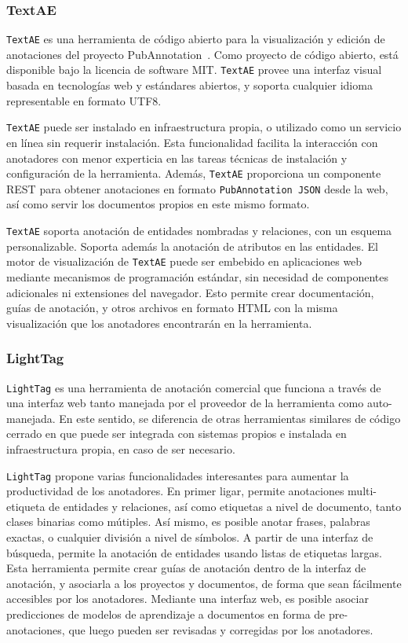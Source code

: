 \subsubsection*{TextAE}

\texttt{TextAE} es una herramienta de código abierto para la visualización y edición de anotaciones del proyecto PubAnnotation~\cite{kim2012pubannotation}.
Como proyecto de código abierto, está disponible bajo la licencia de software MIT.
\texttt{TextAE} provee una interfaz visual basada en tecnologías web y estándares abiertos, y soporta cualquier idioma representable en formato UTF8.

\texttt{TextAE} puede ser instalado en infraestructura propia, o utilizado como un servicio en línea sin requerir instalación.
Esta funcionalidad facilita la interacción con anotadores con menor experticia en las tareas técnicas de instalación y configuración de la herramienta.
Además, \texttt{TextAE} proporciona un componente REST para obtener anotaciones en formato \texttt{PubAnnotation JSON} desde la web, así como servir los documentos propios en este mismo formato.

\texttt{TextAE} soporta anotación de entidades nombradas y relaciones, con un esquema personalizable.
Soporta además la anotación de atributos en las entidades.
El motor de visualización de \texttt{TextAE} puede ser embebido en aplicaciones web mediante mecanismos de programación estándar, sin necesidad de componentes adicionales ni extensiones del navegador.
Esto permite crear documentación, guías de anotación, y otros archivos en formato HTML con la misma visualización que los anotadores encontrarán en la herramienta.

\subsubsection*{LightTag}

\texttt{LightTag} es una herramienta de anotación comercial que funciona a través de una interfaz web tanto manejada por el proveedor de la herramienta como auto-manejada.
En este sentido, se diferencia de otras herramientas similares de código cerrado en que puede ser integrada con sistemas propios e instalada en infraestructura propia, en caso de ser necesario.

\texttt{LightTag} propone varias funcionalidades interesantes para aumentar la productividad de los anotadores.
En primer ligar, permite anotaciones multi-etiqueta de entidades y relaciones, así como etiquetas a nivel de documento, tanto clases binarias como mútiples.
Así mismo, es posible anotar frases, palabras exactas, o cualquier división a nivel de símbolos.
A partir de una interfaz de búsqueda, permite la anotación de entidades usando listas de etiquetas largas.
Esta herramienta permite crear guías de anotación dentro de la interfaz de anotación, y asociarla a los proyectos y documentos, de forma que sean fácilmente accesibles por los anotadores.
Mediante una interfaz web, es posible asociar predicciones de modelos de aprendizaje a documentos en forma de pre-anotaciones, que luego pueden ser revisadas y corregidas por los anotadores.

